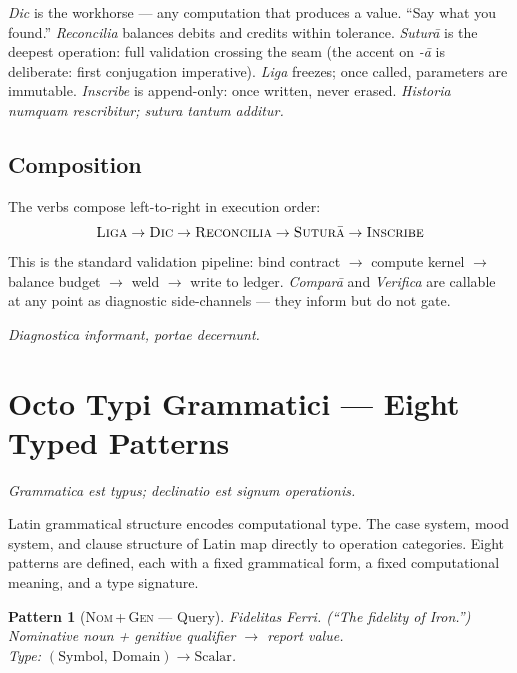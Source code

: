 \documentclass[
  aps,
  prd,
  twocolumn,
  superscriptaddress,
  nofootinbib,
  floatfix
]{revtex4-2}
\newtheorem{pattern}{Pattern}
\newcommand{\beq}{\begin{equation}}
\newcommand{\eeq}{\end{equation}}
\newcommand{\lat}[1]{\textit{#1}}
\begin{document}
\lat{Dic} is the workhorse --- any computation that produces a
value. ``Say what you found.'' \lat{Reconcilia} balances debits
and credits within tolerance. \lat{Sutur\=a} is the deepest
operation: full validation crossing the seam (the accent on
\lat{-\=a} is deliberate: first conjugation imperative). \lat{Liga}
freezes; once called, parameters are immutable. \lat{Inscribe}
is append-only: once written, never erased.
\lat{Historia numquam rescribitur; sutura tantum additur.}

\subsection{Composition}

The verbs compose left-to-right in execution order:
\beq
  \textsc{Liga} \to \textsc{Dic} \to \textsc{Reconcilia}
    \to \textsc{Sutur\=a} \to \textsc{Inscribe}
  \label{eq:pipeline}
\eeq
This is the standard validation pipeline: bind contract
$\to$ compute kernel $\to$ balance budget $\to$ weld $\to$
write to ledger. \lat{Compar\=a} and \lat{Verifica} are callable
at any point as diagnostic side-channels --- they inform but
do not gate.

\lat{Diagnostica informant, portae decernunt.}

\section{Octo Typi Grammatici ---
  Eight Typed Patterns}\label{sec:octo-typi}

\lat{Grammatica est typus; declinatio est signum operationis.}

\smallskip\noindent
Latin grammatical structure encodes computational type. The case
system, mood system, and clause structure of Latin map directly
to operation categories. Eight patterns are defined, each
with a fixed grammatical form, a fixed computational meaning,
and a type signature.

\begin{pattern}[\textsc{Nom\,+\,Gen} --- Query]\label{pat:nom-gen}
\lat{Fidelitas Ferri.} (``The fidelity of Iron.'')\\
Nominative noun + genitive qualifier $\to$ report value.\\
Type: $(\mathrm{Symbol},\,\mathrm{Domain}) \to \mathrm{Scalar}$.
\end{pattern}
\end{document}
